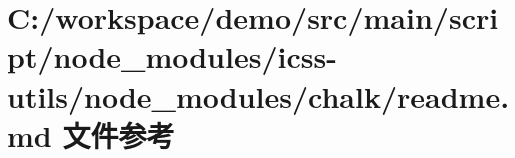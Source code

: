 \hypertarget{node__modules_2icss-utils_2node__modules_2chalk_2_r_e_a_d_m_e_8md}{}\section{C\+:/workspace/demo/src/main/script/node\+\_\+modules/icss-\/utils/node\+\_\+modules/chalk/readme.md 文件参考}
\label{node__modules_2icss-utils_2node__modules_2chalk_2_r_e_a_d_m_e_8md}
